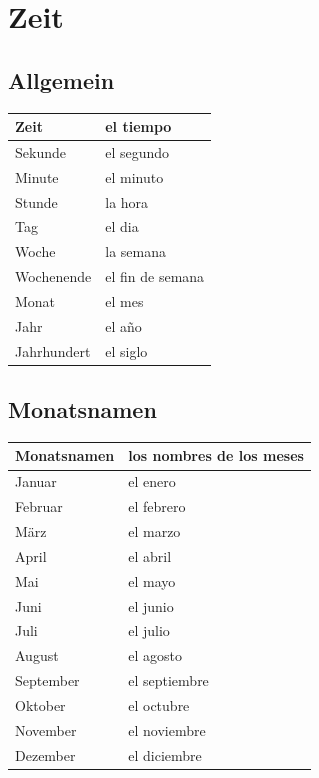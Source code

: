 \documentclass[10pt,spanish]{report}
\begin{document}
\chapter*{Zeit}
\section*{Allgemein}
\begin{longtable}{p{} | p{}} 
\textbf{Zeit}     & \textbf{el tiempo}                                       \\ \hline
\hline
\endhead %
Sekunde & el segundo\\
Minute & el minuto\\
Stunde & la hora\\
Tag & el dia\\
Woche & la semana\\
Wochenende & el fin de semana\\
Monat & el mes\\
Jahr & el a\~{n}o\\
Jahrhundert & el siglo \\

\end{longtable}

\section*{Monatsnamen}
\begin{longtable}{p{} | p{}} 
\textbf{Monatsnamen}     & \textbf{los nombres de los meses}                                       \\ \hline
\hline
\endhead %
Januar & el enero\\
Februar & el febrero\\
März & el marzo\\
April & el abril\\
Mai & el mayo\\
Juni & el junio\\
Juli & el julio\\
August & el agosto\\
September & el septiembre\\
Oktober & el octubre\\
November & el noviembre \\
Dezember & el diciembre \\
\end{longtable}
\end{document}
